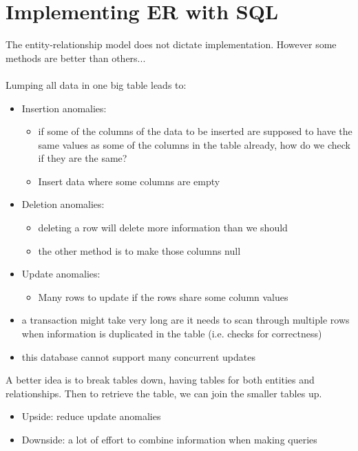 \documentclass[12pt,a4paper]{article} %
\begin{document}
\section{Implementing ER with SQL}
The entity-relationship model does not dictate implementation. However some methods are better than others...
\\\\
Lumping all data in one big table leads to:
\begin{itemize}
\item Insertion anomalies: 
	\begin{itemize}
	\item if some of the columns of the data to be inserted are supposed to have the same values as some of the columns in the table already, how do we check if they are the same?
	\item Insert data where some columns are empty
	\end{itemize}	 
\item Deletion anomalies:
	\begin{itemize}
	\item deleting a row will delete more information than we should
	\item the other method is to make those columns null
	\end{itemize}
\item Update anomalies: 
	\begin{itemize}
	\item Many rows to update if the rows share some column values
	\end{itemize}
\end{itemize}
\begin{itemize}
\item a transaction might take very long are it needs to scan through multiple rows when information is duplicated in the table (i.e. checks for correctness)
\item this database cannot support many concurrent updates
\end{itemize}
A better idea is to break tables down, having tables for both entities and relationships. Then to retrieve the table, we can join the smaller tables up.
\begin{itemize}
\item Upside: reduce update anomalies
\item Downside: a lot of effort to combine information when making queries
\end{itemize}
\end{document}
